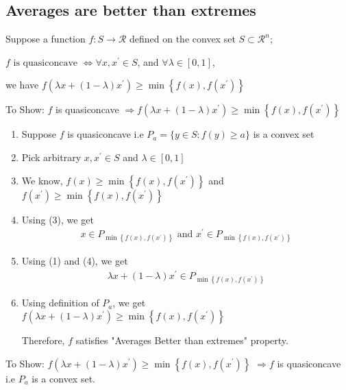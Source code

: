 \documentclass[12pt,a4paper]{article}
\begin{document}
\subsection{Averages are better than extremes}
Suppose a function \(f: S \rightarrow \mathcal{R}\) defined on the convex set \(S \subset \mathcal{R}^n\);
\begin{tcolorbox}
    \(f \text{ is quasiconcave } \Leftrightarrow \forall x, x^{\prime} \in S\), and \(\forall \lambda \in[0,1]\), 
    
    we have \(f\left(\lambda x+(1-\lambda) x^{\prime}\right) \geq \min \left\{f(x), f\left(x^{\prime}\right)\right\}\)
\end{tcolorbox}
 To Show: \(f\) is quasiconcave \( \Longrightarrow f\left(\lambda x+(1-\lambda) x^{\prime}\right) \geq \min \left\{f(x), f\left(x^{\prime}\right)\right\}\)  
\begin{enumerate}
    \item Suppose \(f\) is quasiconcave i.e \(P_a=\{y \in S: f(y) \geq a\}\) is a convex set
    \item Pick arbitrary \(x, x^{\prime} \in S\) and \(\lambda \in[0,1]\)
    \item  We know, \(f(x) \geq \min \left\{f(x), f\left(x^{\prime}\right)\right\}\) and \(f\left(x^{\prime}\right) \geq \min \left\{f(x), f\left(x^{\prime}\right)\right\}\)
    \item Using (3), we get
    \begin{align*}
    x \in P_{\min \left\{f(x), f\left(x^{\prime}\right)\right\}} \text { and } x^{\prime} \in P_{\min \left\{f(x), f\left(x^{\prime}\right)\right\}}
    \end{align*}
    \item Using (1) and (4), we get
    \begin{align*}
    \lambda x+(1-\lambda) x^{\prime} \in P_{\min \left\{f(x), f\left(x^{\prime}\right)\right\}}
    \end{align*}
    \item Using definition of \(P_a\), we get \(f\left(\lambda x+(1-\lambda) x^{\prime}\right) \geq \min \left\{f(x), f\left(x^{\prime}\right)\right\}\)
    
    Therefore, \(f\) satisfies "Averages Better than extremes" property.
\end{enumerate}
To Show: \(f\left(\lambda x+(1-\lambda) x^{\prime}\right) \geq \min \left\{f(x), f\left(x^{\prime}\right)\right\}\) \(\Longrightarrow f\) is quasiconcave i.e \(P_a\) is a convex set.
\end{document}
